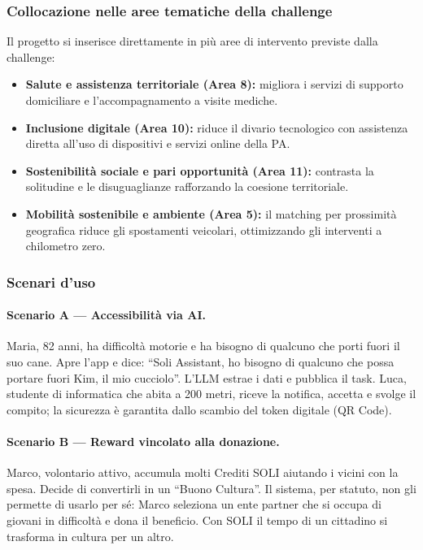 \documentclass[11pt,a4paper]{article}
\begin{document}
\subsubsection{Collocazione nelle aree tematiche della challenge}
Il progetto si inserisce direttamente in pi\`u aree di intervento previste dalla challenge:
\begin{itemize}[leftmargin=1.4em]
  \item \textbf{Salute e assistenza territoriale (Area 8):} migliora i servizi di supporto domiciliare e l'accompagnamento a visite mediche.
  \item \textbf{Inclusione digitale (Area 10):} riduce il divario tecnologico con assistenza diretta all'uso di dispositivi e servizi online della PA.
  \item \textbf{Sostenibilit\`a sociale e pari opportunit\`a (Area 11):} contrasta la solitudine e le disuguaglianze rafforzando la coesione territoriale.
  \item \textbf{Mobilit\`a sostenibile e ambiente (Area 5):} il matching per prossimit\`a geografica riduce gli spostamenti veicolari, ottimizzando gli interventi a chilometro zero.
\end{itemize}

\subsubsection{Scenari d'uso}
\paragraph{Scenario A --- Accessibilit\`a via AI.} Maria, 82 anni, ha difficolt\`a motorie e ha bisogno di qualcuno che porti fuori il suo cane. Apre l'app e dice: ``Soli Assistant, ho bisogno di qualcuno che possa portare fuori Kim, il mio cucciolo''. L'LLM estrae i dati e pubblica il task. Luca, studente di informatica che abita a 200 metri, riceve la notifica, accetta e svolge il compito; la sicurezza \`e garantita dallo scambio del token digitale (QR Code).

\paragraph{Scenario B --- Reward vincolato alla donazione.} Marco, volontario attivo, accumula molti Crediti SOLI aiutando i vicini con la spesa. Decide di convertirli in un ``Buono Cultura''. Il sistema, per statuto, non gli permette di usarlo per s\'e: Marco seleziona un ente partner che si occupa di giovani in difficolt\`a e dona il beneficio. Con SOLI il tempo di un cittadino si trasforma in cultura per un altro.
\end{document}
